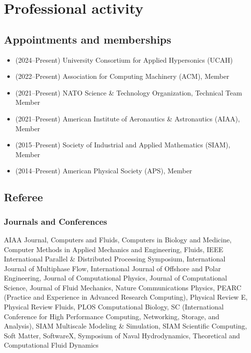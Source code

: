 % 

\section{Professional activity}

\subsection{Appointments and memberships}

\begin{itemize}
    \item (2024--Present) University Consortium for Applied Hypersonics (UCAH)
    \item (2022--Present) Association for Computing Machinery (ACM), Member
    \item (2021--Present) NATO Science \& Technology Organization, Technical Team Member
    \item (2021--Present) American Institute of Aeronautics \& Astronautics (AIAA), Member
    \item (2015--Present) Society of Industrial and Applied Mathematics (SIAM), Member
    \item (2014--Present) American Physical Society (APS), Member
\end{itemize}

\subsection{Referee}

\subsubsection{Journals and Conferences}

AIAA Journal,
Computers and Fluids,
Computers in Biology and Medicine,
Computer Methods in Applied Mechanics and Engineering,
Fluids,
IEEE International Parallel \& Distributed Processing Symposium,
International Journal of Multiphase Flow,
International Journal of Offshore and Polar Engineering,
Journal of Computational Physics,
Journal of Computational Science,
Journal of Fluid Mechanics,
Nature Communications Physics,
PEARC (Practice and Experience in Advanced Research Computing),
Physical Review E,
Physical Review Fluids,
PLOS Computational Biology,
SC (International Conference for High Performance Computing, Networking, Storage, and Analysis),
SIAM Multiscale Modeling \& Simulation,
SIAM Scientific Computing,
Soft Matter,
SoftwareX,
Symposium of Naval Hydrodynamics,
Theoretical and Computational Fluid Dynamics

